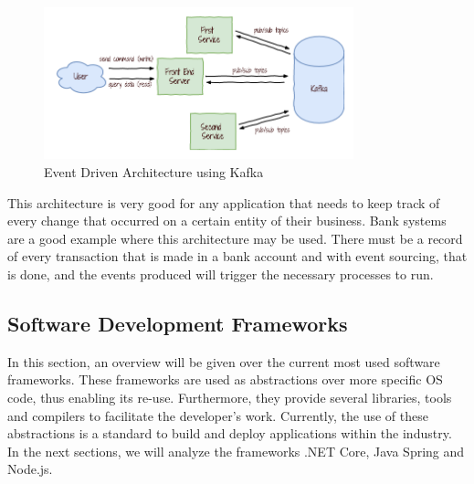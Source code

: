 \begin{figure}[ht]
\centering
\includegraphics[width=0.8\textwidth,keepaspectratio]{chapters/State_of_the_Art/assets/kafka-event-sourcing.png}
\caption[Event Driven Architecture using Kafka]{Event Driven Architecture using Kafka\footnotemark}
\label{fig:kafkaEvent}
\end{figure}


\par

This architecture is very good for any application that needs to keep track of every change that occurred on a certain entity of their business. Bank systems are a good example where this architecture may be used. There must be a record of every transaction that is made in a bank account and with event sourcing, that is done, and the events produced will trigger the necessary processes to run. 

\subsection{Software Development Frameworks}

In this section, an overview will be given over the current most used software frameworks. These frameworks are used as abstractions over more specific \gls{OS} code, thus enabling its re-use. Furthermore, they provide several libraries, tools and compilers to facilitate the developer's work. Currently, the use of these abstractions is a standard to build and deploy applications within the industry. In the next sections, we will analyze the frameworks .NET Core, Java Spring and Node.js.

